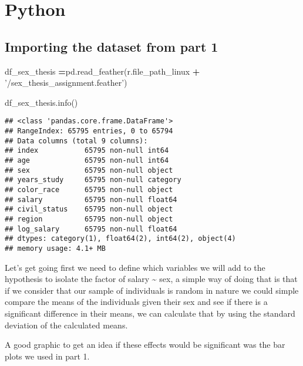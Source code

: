 \documentclass[]{article}
\newenvironment{Shaded}{\begin{snugshade}}{\end{snugshade}}
\newcommand{\NormalTok}[1]{#1}
\newcommand{\OperatorTok}[1]{\textcolor[rgb]{0.81,0.36,0.00}{\textbf{#1}}}
\newcommand{\StringTok}[1]{\textcolor[rgb]{0.31,0.60,0.02}{#1}}
\begin{document}
\hypertarget{python}{%
\section{Python}\label{python}}

\hypertarget{importing-the-dataset-from-part-1}{%
\subsection{Importing the dataset from part
1}\label{importing-the-dataset-from-part-1}}

\begin{Shaded}
\begin{Highlighting}[]
\NormalTok{df_sex_thesis }\OperatorTok{=}\NormalTok{pd.read_feather(r.file_path_linux }\OperatorTok{+} \StringTok{'/sex_thesis_assignment.feather'}\NormalTok{)}
\end{Highlighting}
\end{Shaded}

\begin{Shaded}
\begin{Highlighting}[]
\NormalTok{df_sex_thesis.info()}
\end{Highlighting}
\end{Shaded}

\begin{verbatim}
## <class 'pandas.core.frame.DataFrame'>
## RangeIndex: 65795 entries, 0 to 65794
## Data columns (total 9 columns):
## index           65795 non-null int64
## age             65795 non-null int64
## sex             65795 non-null object
## years_study     65795 non-null category
## color_race      65795 non-null object
## salary          65795 non-null float64
## civil_status    65795 non-null object
## region          65795 non-null object
## log_salary      65795 non-null float64
## dtypes: category(1), float64(2), int64(2), object(4)
## memory usage: 4.1+ MB
\end{verbatim}

Let's get going first we need to define which variables we will add to
the hypothesis to isolate the factor of salary \textasciitilde{} sex, a
simple way of doing that is that if we consider that our sample of
individuals is random in nature we could simple compare the means of the
individuals given their sex and see if there is a significant difference
in their means, we can calculate that by using the standard deviation of
the calculated means.

A good graphic to get an idea if these effects would be significant was
the bar plots we used in part 1.
\end{document}
